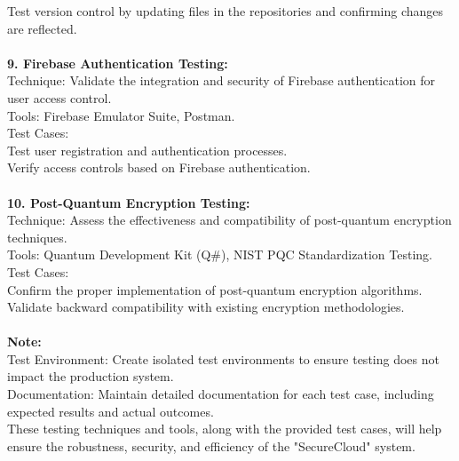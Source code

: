Test version control by updating files in the repositories and confirming changes are reflected. 
\\
\\
\textbf{9. Firebase Authentication Testing:}\\
Technique: Validate the integration and security of Firebase authentication for user access control.\\
Tools: Firebase Emulator Suite, Postman.\\
Test Cases:\\
Test user registration and authentication processes.\\
Verify access controls based on Firebase authentication. 
\\
\\
\textbf{10. Post-Quantum Encryption Testing: }\\
Technique: Assess the effectiveness and compatibility of post-quantum encryption techniques.\\
Tools: Quantum Development Kit (Q#), NIST PQC Standardization Testing.\\
Test Cases:\\
Confirm the proper implementation of post-quantum encryption algorithms.\\
Validate backward compatibility with existing encryption methodologies. 
\\
\\
\textbf{Note:}\\
Test Environment: Create isolated test environments to ensure testing does not impact the production
system.\\
Documentation: Maintain detailed documentation for each test case, including expected results and
actual outcomes.\\
These testing techniques and tools, along with the provided test cases, will help ensure the robustness,
security, and efficiency of the "SecureCloud" system.

